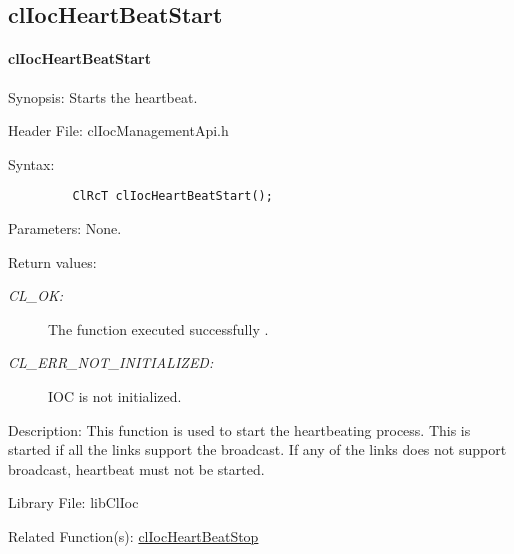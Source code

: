 \begin{flushleft}
\subsection{clIocHeartBeatStart}
\hypertarget{pageioc217}{}\paragraph{cl\-Ioc\-Heart\-Beat\-Start}\label{pageioc217}
\begin{Desc}
\item[Synopsis:]Starts the heartbeat.\end{Desc}
\begin{Desc}
\item[Header File:]clIocManagementApi.h\end{Desc}
\begin{Desc}
\item[Syntax:]

\footnotesize\begin{verbatim}         ClRcT clIocHeartBeatStart();
\end{verbatim}
\normalsize
\end{Desc}
\begin{Desc}
\item[Parameters:]None.\end{Desc}
\begin{Desc}
\item[Return values:]
\begin{description}
\item[{\em CL\_\-OK:}]The function executed successfully . \item[{\em CL\_\-ERR\_\-NOT\_\-INITIALIZED:}]IOC is not initialized.\end{description}
\end{Desc}
\begin{Desc}
\item[Description:]This function is used to start the heartbeating process. This is started if all the links support the broadcast. If any of the links
does not support broadcast, heartbeat must not be started.\end{Desc}
\begin{Desc}
\item[Library File:]libClIoc\end{Desc}
\begin{Desc}
\item[Related Function(s):]\hyperlink{pageioc216}{cl\-Ioc\-Heart\-Beat\-Stop} \end{Desc}
\newpage



\end{flushleft}
